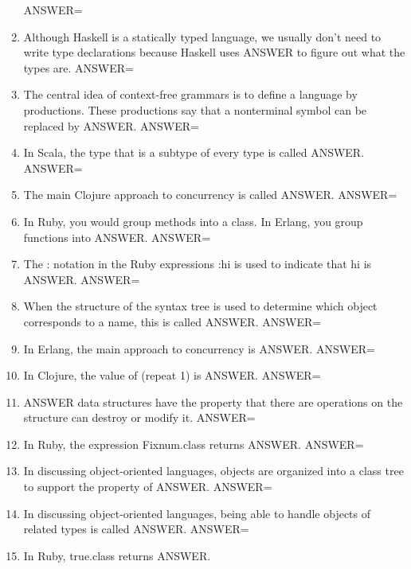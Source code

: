 \documentclass{exam}
\begin{document}
\begin{enumerate}
ANSWER=
\item Although Haskell is a statically typed language, we usually don't need to write type declarations because Haskell uses ANSWER to figure out what the types are.\newline
ANSWER=
\item The central idea of context-free grammars is to define a language by productions.  These productions say that a nonterminal symbol can be replaced by ANSWER.\newline
ANSWER=
\item In Scala, the type that is a subtype of every type is called ANSWER.\newline
ANSWER=
\item The main Clojure approach to concurrency is called ANSWER.\newline
ANSWER=
\item In Ruby, you would group methods into a class.  In Erlang, you group functions into ANSWER.\newline
ANSWER=
\item The : notation in the Ruby expressions :hi is used to indicate that hi is ANSWER.\newline
ANSWER=
\item When the structure of the syntax tree is used to determine which object corresponds to a name, this is called ANSWER.\newline
ANSWER=
\item In Erlang, the main approach to concurrency is ANSWER.\newline
ANSWER=
\item In Clojure, the value of (repeat 1) is ANSWER.\newline
ANSWER=
\item ANSWER data structures have the property that there are operations on the structure can destroy or modify it.\newline
ANSWER=
\item In Ruby, the expression Fixnum.class returns ANSWER.\newline
ANSWER=
\item In discussing object-oriented languages, objects are organized into a class tree to support the property of ANSWER.\newline
ANSWER=
\item In discussing object-oriented languages, being able to handle objects of related types is called ANSWER.\newline
ANSWER=
\item In Ruby, true.class returns ANSWER.\newline

\end{enumerate}
\end{document}
